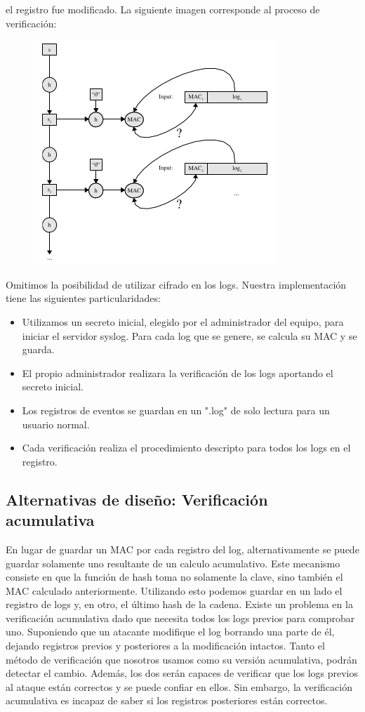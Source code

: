 el registro fue modificado. La siguiente imagen corresponde al proceso de verificación:
\begin{figure}[H]
\centering
\includegraphics[scale=1]{imagenes/Verification.png}
\end{figure}
Omitimos la posibilidad de utilizar cifrado en los logs.
Nuestra implementación tiene las siguientes particularidades:
\begin{itemize}
\item Utilizamos un secreto inicial, elegido por el administrador del equipo, para iniciar el servidor syslog.
Para cada log que se genere, se calcula su MAC y se guarda.
\item El propio administrador realizara la verificación de los logs aportando el secreto inicial.
\item Los registros de eventos se guardan en un ".log" de solo lectura para un usuario normal.
\item Cada verificación realiza el procedimiento descripto para todos los logs en el registro.
\end{itemize}
\subsection{Alternativas de diseño: Verificación acumulativa}
En lugar de guardar un MAC por cada registro del log, alternativamente se puede guardar solamente uno resultante de un calculo acumulativo. Este mecanismo consiste en que la función de hash toma no solamente la clave, sino también el MAC calculado anteriormente. 
Utilizando esto podemos guardar en un lado el registro de logs y, en otro, el último hash de la cadena. 
Existe un problema en la verificación acumulativa dado que necesita todos los logs previos para comprobar uno. Suponiendo que un atacante modifique el log borrando una parte de él, dejando registros previos y posteriores a la modificación intactos. Tanto el método de verificación que nosotros usamos como su versión acumulativa, podrán detectar el cambio. Además, los dos serán capaces de verificar que los logs previos al ataque están correctos y se puede confiar en ellos. Sin embargo, la verificación acumulativa es incapaz de saber si los registros posteriores están correctos.   
